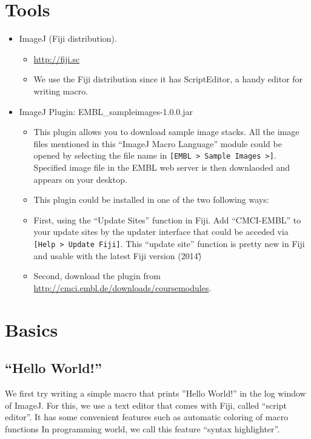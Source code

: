 \documentclass[11pt,a4paper,oneside]{report}
\newcommand{\ijmenu}[1]{\texttt{\small#1}}
\begin{document}
\newpage

\section{Tools}
\label{sec:tools}
 
\begin{itemize}
  \item ImageJ (Fiji distribution).
  \begin{itemize}
    \item \url{http://fiji.sc}
    \item We use the Fiji distribution since it has ScriptEditor, a handy editor for writing macro. 
  \end{itemize}
  \item ImageJ Plugin: EMBL\_sampleimages-1.0.0.jar
  \begin{itemize}
     \item This plugin allows you to download sample image stacks. All the image files mentioned in this ``ImageJ Macro Language'' module could be opened by selecting the file name in \ijmenu{[EMBL > Sample Images >]}. Specified image file in the EMBL web server is then downlaoded and appears on your desktop.
    \item This plugin could be installed in one of the two following ways:
    \item First, using the ``Update Sites'' function in Fiji. Add ``CMCI-EMBL'' to your update sites by the updater interface that could be acceded via \ijmenu{[Help > Update Fiji]}. This ``update site'' function is pretty new in Fiji and usable with the latest Fiji version (2014\~)        
    \item Second, download the plugin from \url{http://cmci.embl.de/downloads/coursemodules}. 
  \end{itemize}
\end{itemize}
 
\newpage

\section{Basics}
\label{sec:ImageJMacroBasics}

  \subsection{``Hello World!''}
We first try writing a simple macro that prints ''Hello World!'' in the log window of ImageJ. For this, we use a text editor that comes with Fiji, called ``script editor''. 
It has some convenient features such as automatic coloring of macro functions {In programming world, we call this feature ``syntax highlighter''}. 
\end{document}
